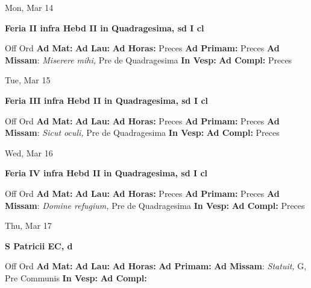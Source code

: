 \documentclass[10pt]{article}
\begin{document}
\begin{minipage}{3.5in}
\vspace{2em}\begin{center}
Mon, Mar 14
\end{center}\textbf{ \large Feria II infra Hebd II in Quadragesima, \textnormal{\normalsize sd I cl}}
\begin{justify}
Off Ord
\textbf{Ad Mat: }
\textbf{Ad Lau: }
\textbf{Ad Horas: }Preces
\textbf{Ad Primam: }Preces
\textbf{Ad Missam}: \textit{Miserere mihi,} Pre de Quadragesima
\textbf{In Vesp: }
\textbf{Ad Compl: }Preces\end{justify}
\end{minipage}



\begin{minipage}{3.5in}
\vspace{2em}\begin{center}
Tue, Mar 15
\end{center}\textbf{ \large Feria III infra Hebd II in Quadragesima, \textnormal{\normalsize sd I cl}}
\begin{justify}
Off Ord
\textbf{Ad Mat: }
\textbf{Ad Lau: }
\textbf{Ad Horas: }Preces
\textbf{Ad Primam: }Preces
\textbf{Ad Missam}: \textit{Sicut oculi,} Pre de Quadragesima
\textbf{In Vesp: }
\textbf{Ad Compl: }Preces\end{justify}
\end{minipage}



\begin{minipage}{3.5in}
\vspace{2em}\begin{center}
Wed, Mar 16
\end{center}\textbf{ \large Feria IV infra Hebd II in Quadragesima, \textnormal{\normalsize sd I cl}}
\begin{justify}
Off Ord
\textbf{Ad Mat: }
\textbf{Ad Lau: }
\textbf{Ad Horas: }Preces
\textbf{Ad Primam: }Preces
\textbf{Ad Missam}: \textit{Domine refugium,} Pre de Quadragesima
\textbf{In Vesp: }
\textbf{Ad Compl: }Preces\end{justify}
\end{minipage}



\begin{minipage}{3.5in}
\vspace{2em}\begin{center}
Thu, Mar 17
\end{center}\textbf{ \large S Patricii EC, \textnormal{\normalsize d}}
\begin{justify}
Off Ord
\textbf{Ad Mat: }
\textbf{Ad Lau: }
\textbf{Ad Horas: }
\textbf{Ad Primam: }
\textbf{Ad Missam}: \textit{Statuit,} G, Pre Communis
\textbf{In Vesp: }
\textbf{Ad Compl: }\end{justify}
\end{minipage}
\end{document}
